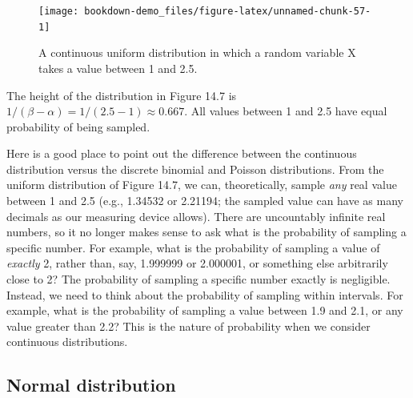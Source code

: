 \documentclass[
]{scrbook}
\begin{document}
\begin{figure}
\texttt{[image: bookdown-demo\_files/figure-latex/unnamed-chunk-57-1]} \caption{A continuous uniform distribution in which a random variable X takes a value between 1 and 2.5.}\label{fig:unnamed-chunk-57}
\end{figure}

The height of the distribution in Figure 14.7 is \(1/(\beta - \alpha) = 1/(2.5 - 1) \approx 0.667\).
All values between 1 and 2.5 have equal probability of being sampled.

Here is a good place to point out the difference between the continuous distribution versus the discrete binomial and Poisson distributions.
From the uniform distribution of Figure 14.7, we can, theoretically, sample \emph{any} real value between 1 and 2.5 (e.g., 1.34532 or 2.21194; the sampled value can have as many decimals as our measuring device allows).
There are uncountably infinite real numbers, so it no longer makes sense to ask what is the probability of sampling a specific number.
For example, what is the probability of sampling a value of \emph{exactly} 2, rather than, say, 1.999999 or 2.000001, or something else arbitrarily close to 2?
The probability of sampling a specific number exactly is negligible.
Instead, we need to think about the probability of sampling within intervals.
For example, what is the probability of sampling a value between 1.9 and 2.1, or any value greater than 2.2?
This is the nature of probability when we consider continuous distributions.

\hypertarget{normal-distribution}{%
\subsection{Normal distribution}\label{normal-distribution}}
\end{document}
